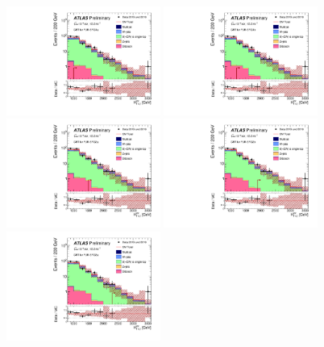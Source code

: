 \begin{figure}[tbp]
\begin{center}
\includegraphics[width=0.45\textwidth]{figures/ATLAS-CONF-2016-078_INT/N-1Plots/AtlasStyle/Preliminary/CRT_SRJigsawSRG1a_LastCut_CRT_minusone}
\includegraphics[width=0.45\textwidth]{figures/ATLAS-CONF-2016-078_INT/N-1Plots/AtlasStyle/Preliminary/CRT_SRJigsawSRG1b_LastCut_CRT_minusone}
\includegraphics[width=0.45\textwidth]{figures/ATLAS-CONF-2016-078_INT/N-1Plots/AtlasStyle/Preliminary/CRT_SRJigsawSRG2a_LastCut_CRT_minusone}
\includegraphics[width=0.45\textwidth]{figures/ATLAS-CONF-2016-078_INT/N-1Plots/AtlasStyle/Preliminary/CRT_SRJigsawSRG2b_LastCut_CRT_minusone}
\includegraphics[width=0.45\textwidth]{figures/ATLAS-CONF-2016-078_INT/N-1Plots/AtlasStyle/Preliminary/CRT_SRJigsawSRG3a_LastCut_CRT_minusone}

\end{center}
\end{figure}
